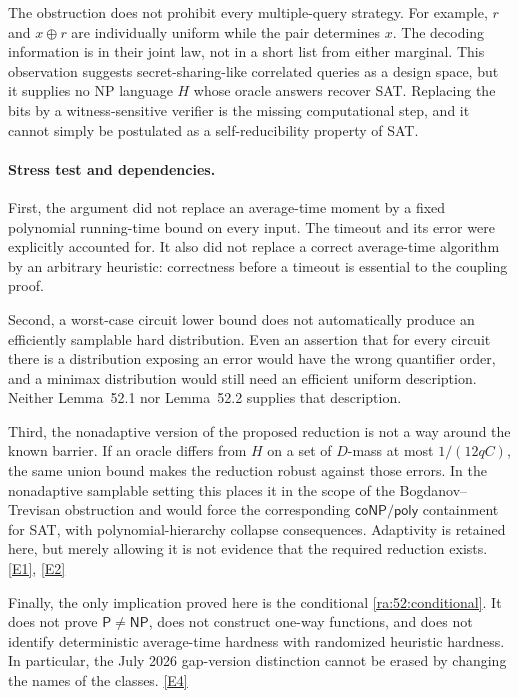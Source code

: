 \documentclass[11pt]{article}
\newcommand{\eref}[2]{\hyperlink{extra:#1:#2}{[E#2]}}
\begin{document}
The obstruction does not prohibit every multiple-query strategy. For
example, $r$ and $x\mathbin{\oplus}r$ are individually uniform while the
pair determines $x$. The decoding information is in their joint law,
not in a short list from either marginal. This observation suggests
secret-sharing-like correlated queries as a design space, but it supplies
no NP language $H$ whose oracle answers recover SAT. Replacing the bits
by a witness-sensitive verifier is the missing computational step, and
it cannot simply be postulated as a self-reducibility property of SAT.

\paragraph{Stress test and dependencies.}
First, the argument did not replace an average-time moment by a fixed
polynomial running-time bound on every input. The timeout and its error
were explicitly accounted for. It also did not replace a correct
average-time algorithm by an arbitrary heuristic: correctness before a
timeout is essential to the coupling proof.

Second, a worst-case circuit lower bound does not automatically produce
an efficiently samplable hard distribution. Even an assertion that for
every circuit there is a distribution exposing an error would have the
wrong quantifier order, and a minimax distribution would still need an
efficient uniform description. Neither Lemma~52.1 nor Lemma~52.2 supplies
that description.

Third, the nonadaptive version of the proposed reduction is not a way
around the known barrier. If an oracle differs from $H$ on a set of
$D$-mass at most $1/(12qC)$, the same union bound makes the reduction
robust against those errors. In the nonadaptive samplable setting this
places it in the scope of the Bogdanov--Trevisan obstruction and would
force the corresponding $\mathsf{coNP/poly}$ containment for SAT, with
polynomial-hierarchy collapse consequences. Adaptivity is retained here,
but merely allowing it is not evidence that the required reduction exists.
\eref{52}{1}, \eref{52}{2}

Finally, the only implication proved here is the conditional
\eqref{ra:52:conditional}. It does not prove $\mathsf P\ne\mathsf{NP}$,
does not construct one-way functions, and does not identify deterministic
average-time hardness with randomized heuristic hardness. In particular,
the July 2026 gap-version distinction cannot be erased by changing the
names of the classes. \eref{52}{4}
\end{document}
